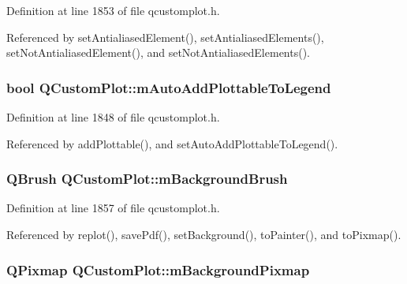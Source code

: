 Definition at line 1853 of file qcustomplot.\+h.



Referenced by set\+Antialiased\+Element(), set\+Antialiased\+Elements(), set\+Not\+Antialiased\+Element(), and set\+Not\+Antialiased\+Elements().

\hypertarget{class_q_custom_plot_aaf3ea6a4cb04d35a149cc9a0cdac3394}{}
\subsubsection[{m\+Auto\+Add\+Plottable\+To\+Legend}]{\setlength{\rightskip}{0pt plus 5cm}bool Q\+Custom\+Plot\+::m\+Auto\+Add\+Plottable\+To\+Legend\hspace{0.3cm}{\ttfamily [protected]}}\label{class_q_custom_plot_aaf3ea6a4cb04d35a149cc9a0cdac3394}


Definition at line 1848 of file qcustomplot.\+h.



Referenced by add\+Plottable(), and set\+Auto\+Add\+Plottable\+To\+Legend().

\hypertarget{class_q_custom_plot_a3aef5de4ac012178e3293248e9c63737}{}
\subsubsection[{m\+Background\+Brush}]{\setlength{\rightskip}{0pt plus 5cm}Q\+Brush Q\+Custom\+Plot\+::m\+Background\+Brush\hspace{0.3cm}{\ttfamily [protected]}}\label{class_q_custom_plot_a3aef5de4ac012178e3293248e9c63737}


Definition at line 1857 of file qcustomplot.\+h.



Referenced by replot(), save\+Pdf(), set\+Background(), to\+Painter(), and to\+Pixmap().

\hypertarget{class_q_custom_plot_ae8f4677399324a78c5f8dbfb95a34f90}{}
\subsubsection[{m\+Background\+Pixmap}]{\setlength{\rightskip}{0pt plus 5cm}Q\+Pixmap Q\+Custom\+Plot\+::m\+Background\+Pixmap\hspace{0.3cm}{\ttfamily [protected]}}\label{class_q_custom_plot_ae8f4677399324a78c5f8dbfb95a34f90}


